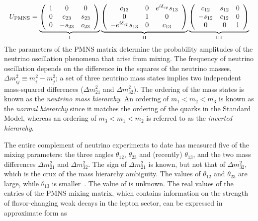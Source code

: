\begin{equation}
U_{\rm PMNS} = 
  \underbrace{
    \left( \begin{array}{ccc}
        1 & 0 & 0 \\ 
        0 & c_{23} & s_{23} \\ 
        0 & -s_{23} & c_{23}
    \end{array} \right)
  }_{\rm I}
\underbrace{
  \left( \begin{array}{ccc}
      c_{13} & 0 & e^{i\delta_{cp}}s_{13} \\ 
      0 & 1 & 0 \\ 
      -e^{i\delta_{cp}}s_{13} & 0 & c_{13}
  \end{array} \right) 
}_{\rm II}
\underbrace{
 \left( \begin{array}{ccc}
      c_{12} & s_{12} & 0 \\ 
      -s_{12} & c_{12} & 0 \\ 
      0 & 0 & 1
  \end{array} \right) 
}_{\rm III}
\label{eqn:pmns}
\end{equation}
The parameters of the PMNS
matrix determine the probability amplitudes of the neutrino
oscillation phenomena that arise from mixing.  The frequency of neutrino oscillation 
depends on the difference in the squares of the neutrino
masses, $\Delta m^{2}_{ij} \equiv m^{2}_{i} - m^{2}_{j}$; a set of three
neutrino mass states implies two independent mass-squared differences
($\Delta m^{2}_{21}$ and $\Delta m^{2}_{32}$). The ordering of the
mass states is known as the \emph{neutrino mass hierarchy}. An ordering of
$m_1 < m_2 < m_3$ is known as the \emph{normal hierarchy} since it matches
the ordering of the quarks in the Standard Model, whereas an ordering of $m_3 < m_1 < m_2$
is referred to as the \emph{inverted hierarchy}.

The entire complement of neutrino experiments to date has measured
five of the mixing parameters: the three angles $\theta_{12}$,
$\theta_{23}$ and (recently) $\theta_{13}$, and the two mass differences
$\Delta m^{2}_{21}$ and $\Delta m^{2}_{32}$. The sign of $\Delta
m^{2}_{21}$ is known, but not that of $\Delta m^{2}_{32}$, which 
is the crux of the 
mass hierarchy ambiguity.
The values of $\theta_{12}$ and $\theta_{23}$ are large, while 
$\theta_{13}$ is smaller~\cite{An:2013zwz}. The value of \deltacp is unknown.
The real values of the entries of the PMNS mixing matrix, which
contains information on the strength of flavor-changing weak decays in
the lepton sector, can be expressed in approximate form as

